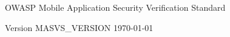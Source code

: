 \thispagestyle{empty} %

OWASP Mobile Application Security Verification Standard


Version MASVS\_VERSION \today